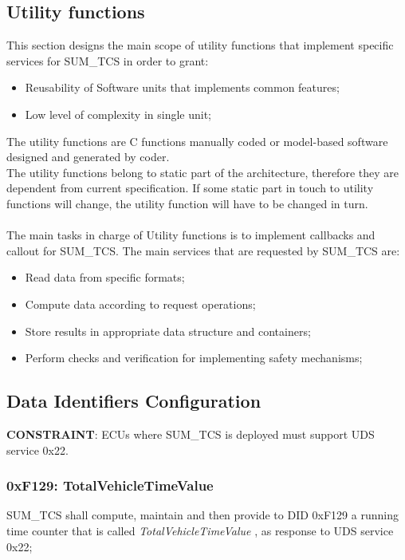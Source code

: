 \subsection{Utility functions}
\label{sec:utility-funcs}
This section designs the main scope of utility functions that implement specific services for SUM\_TCS in order to grant:

\begin{itemize}
	\item Reusability of Software units that implements common features;
	\item Low level of complexity in single unit;
\end{itemize}

The utility functions are C functions manually coded or model-based software designed and generated by coder.
\\
The utility functions belong to static part of the architecture, therefore they are dependent from current specification. If some static part in touch to utility functions will change,
the utility function will have to be changed in turn.
\\
\\
The main tasks in charge of Utility functions is to implement callbacks and callout for SUM\_TCS. The main services that are requested by SUM\_TCS are:

\begin{itemize}
	\item Read data from specific formats;
	\item Compute data according to request operations;
	\item Store results in appropriate data structure and containers;
	\item Perform checks and verification for implementing safety mechanisms;
\end{itemize}

\subsection{Data Identifiers Configuration}

\textbf{CONSTRAINT}: ECUs where SUM\_TCS is deployed must support UDS service 0x22.
\subsubsection{0xF129: TotalVehicleTimeValue }
\label{sub:TotalVehicleTimeValue }
SUM\_TCS shall compute, maintain and then provide to DID 0xF129 a running time counter that is called \textit{TotalVehicleTimeValue }, as response to UDS service 0x22;

